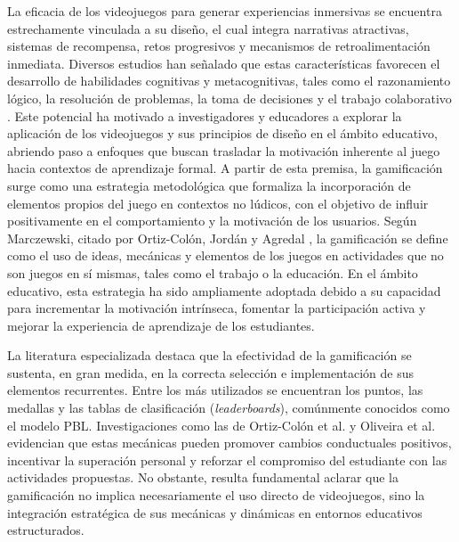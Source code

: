 La eficacia de los videojuegos para generar experiencias inmersivas se encuentra estrechamente vinculada a su diseño, el cual integra narrativas atractivas, sistemas de recompensa, retos progresivos y mecanismos de retroalimentación inmediata. Diversos estudios han señalado que estas características favorecen el desarrollo de habilidades cognitivas y metacognitivas, tales como el razonamiento lógico, la resolución de problemas, la toma de decisiones y el trabajo colaborativo \cite{cerezo-pizarro_cultural_2023}. Este potencial ha motivado a investigadores y educadores a explorar la aplicación de los videojuegos y sus principios de diseño en el ámbito educativo, abriendo paso a enfoques que buscan trasladar la motivación inherente al juego hacia contextos de aprendizaje formal.
A partir de esta premisa, la gamificación surge como una estrategia metodológica que formaliza la incorporación de elementos propios del juego en contextos no lúdicos, con el objetivo de influir positivamente en el comportamiento y la motivación de los usuarios. Según Marczewski, citado por Ortiz-Colón, Jordán y Agredal \cite{ortiz-colon_gamificacion_2018}, la gamificación se define como el uso de ideas, mecánicas y elementos de los juegos en actividades que no son juegos en sí mismas, tales como el trabajo o la educación. En el ámbito educativo, esta estrategia ha sido ampliamente adoptada debido a su capacidad para incrementar la motivación intrínseca, fomentar la participación activa y mejorar la experiencia de aprendizaje de los estudiantes.

La literatura especializada destaca que la efectividad de la gamificación se sustenta, en gran medida, en la correcta selección e implementación de sus elementos recurrentes. Entre los más utilizados se encuentran los puntos, las medallas y las tablas de clasificación (\textit{leaderboards}), comúnmente conocidos como el modelo PBL. Investigaciones como las de Ortiz-Colón et al. \cite{ortiz-colon_gamificacion_2018} y Oliveira et al. \cite{oliveira_does_2021} evidencian que estas mecánicas pueden promover cambios conductuales positivos, incentivar la superación personal y reforzar el compromiso del estudiante con las actividades propuestas. No obstante, resulta fundamental aclarar que la gamificación no implica necesariamente el uso directo de videojuegos, sino la integración estratégica de sus mecánicas y dinámicas en entornos educativos estructurados.

